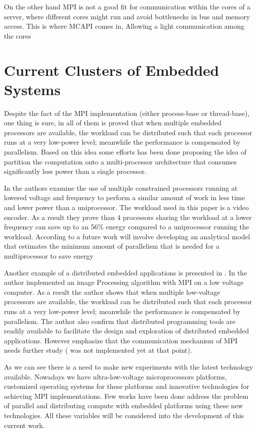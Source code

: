 On the other hand MPI is not a good fit for communication within the cores of a
server, where different cores might run and avoid bottlenecks in bus and memory
access. This is where MCAPI comes in, Allowing a light communication among the
cores 

\section{Current Clusters of Embedded Systems}

Despite the fact of the MPI implementation (either process-base or
thread-base), one thing is sure, in all of them is proved that when multiple
embedded processors are available, the workload can be distributed such that
each processor runs at a very low-power level; meanwhile the performance is
compensated by parallelism. Based on this idea some efforts has been done
\cite{Liu} \cite{Weglarz} proposing the idea of partition the computation onto
a multi-processor architecture that consumes significantly less power than a
single processor.

In \cite{Weglarz} the authors examine the use of multiple constrained
processors running at lowered voltage and frequency to perform a similar amount
of work in less time and lower power than a uniprocessor.  The workload used in
this paper is a video encoder. As a result they prove than 4 processors sharing
the workload at a lower frequency can save up to an 56\% energy compared to a
uniprocessor running the workload. According to \cite{Weglarz} a future work
will involve developing an analytical model that estimates the minimum amount
of parallelism that is needed for a multiprocessor to save energy

Another example of a distributed embedded applications is presented in
\cite{Liu}. In \cite{Liu} the author implemented an image Processing algorithm
with MPI on a low voltage computer. As a result the author shows that when
multiple low-voltage processors are available, the workload can be distributed
such that each processor runs at a very low-power level; meanwhile the
performance is compensated by parallelism. The author also confirm that
distributed programming tools are readily available to facilitate the design
and exploration of distributed embedded applications. However emphasize that
the communication mechanism of MPI needs further study ( \cite{Abgaria} was not
implemented yet at that point). 

As we can see there is a need to make new experiments with the latest
technology available. Nowadays we have ultra-low-voltage microprocessors
platforms, customized operating systems for these platforms and  innovative
technologies for achieving MPI implementations. Few works \cite{Victor-Marcos}
\cite{Victor-Marcos-elc} have been done address the problem of parallel and
distributing compute with embedded platforms using these new technologies. All
these variables will be considered into the development of this current work.

\newpage

\clearpage
